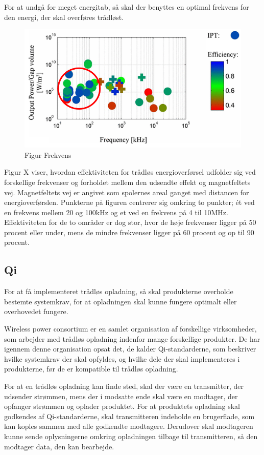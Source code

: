 For at undgå for meget energitab, så skal der benyttes en optimal frekvens for den energi, der skal overføres trådløst.

\begin{figure}[H]
\centering
\includegraphics[scale=0.5]{Vildledning/Schematics/Power_vs_frekvens.png}
\caption{Figur Frekvens}
\end{figure}

Figur X viser, hvordan effektiviteten for trådløs energioverførsel udfolder sig ved forskellige frekvenser og forholdet mellem den udsendte effekt og magnetfeltets vej. Magnetfeltets vej er angivet som spolernes areal ganget med distancen for energioverførslen. Punkterne på figuren centrerer sig omkring to punkter; ét ved en frekvens mellem 20 og 100kHz og et ved en frekvens på 4 til 10MHz. Effektiviteten for de to områder er dog stor, hvor de høje frekvenser ligger på 50 procent eller under, mens de mindre frekvenser ligger på 60 procent og op til 90 procent.

\subsection{Qi}
For at få implementeret trådløs opladning, så skal produkterne overholde bestemte systemkrav, for at opladningen skal kunne fungere optimalt eller overhovedet fungere.

Wireless power consortium er en samlet organisation af forskellige virksomheder, som arbejder med trådløs opladning indenfor mange forskellige produkter. De har igennem denne organisation opsat det, de kalder Qi-standarderne, som beskriver hvilke systemkrav der skal opfyldes, og hvilke dele der skal implementeres i produkterne, før de er kompatible til trådløs opladning.

For at en trådløs opladning kan finde sted, skal der være en transmitter, der udsender strømmen, mens der i modsatte ende skal være en modtager, der opfanger strømmen og oplader produktet. For at produktets opladning skal godkendes af Qi-standarderne, skal transmitteren indeholde en brugerflade, som kan koples sammen med alle godkendte modtagere. Derudover skal modtageren kunne sende oplysningerne omkring opladningen tilbage til transmitteren, så den modtager data, den kan bearbejde.
